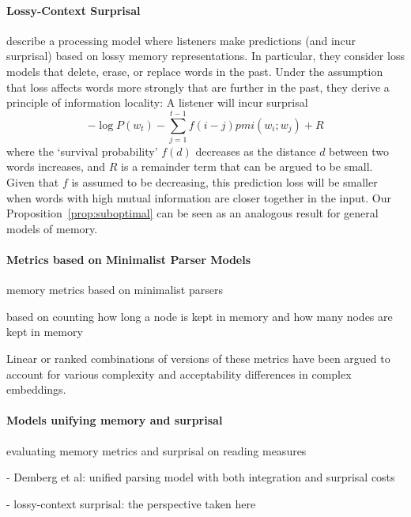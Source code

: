 \paragraph{Lossy-Context Surprisal}
\citet{futrell-noisy-context-2017} describe a processing model where listeners make predictions (and incur surprisal) based on lossy memory representations.
In particular, they consider loss models that delete, erase, or replace words in the past.
Under the assumption that loss affects words more strongly that are further in the past, they derive a principle of information locality:
A listener will incur surprisal
$$ -\log P(w_t) - \sum_{j=1}^{t-1} f(i-j) pmi(w_i; w_j) + R$$
where the `survival probability' $f(d)$ decreases as the distance $d$ between two words increases, and $R$ is a remainder term that can be argued to be small.
Given that $f$ is assumed to be decreasing, this prediction loss will be smaller when words with high mutual information are closer together in the input.
Our Proposition~\ref{prop:suboptimal} can be seen as an analogous result for general models of memory.


\paragraph{Metrics based on Minimalist Parser Models}
memory metrics based on minimalist parsers

\cite{kobele2013memory}
\cite{graf2014evaluating}
\cite{GrafEtAl15MOL}
\cite{gerth2015memory}
\cite{GrafEtAl17JLM}
\cite{desanto2020parsing}
based on counting how long a node is kept in memory and how many nodes are kept in memory

Linear or ranked combinations of versions of these metrics have been argued to account for various complexity and acceptability differences in complex embeddings.

\paragraph{Models unifying memory and surprisal}


evaluating memory metrics and surprisal on reading measures \cite{boston2008parsing} \cite{demberg2008data} \cite{boston2011parallel}

- Demberg et al: unified parsing model with both integration and surprisal costs \cite{demberg2009computational,demberg2013incremental}

- lossy-context surprisal: the perspective taken here


